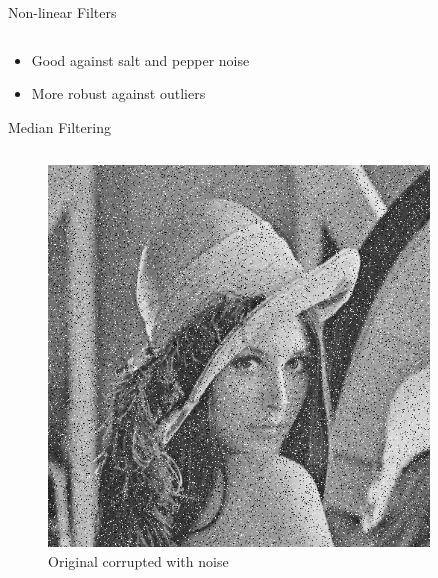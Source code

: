 \begin{frame}[t]{Non-linear Filters}
\begin{columns}[T, onlytextwidth]
\begin{column}{0.5\textwidth}
        \end{column}
    \end{columns}
    \vspace{-4.5\bigskipamount}
    {}
    \begin{itemize}
        \item Good against salt and pepper noise
        \item More robust against outliers
    \end{itemize}
\end{frame}

\begin{frame}[c]{Median Filtering}
    \begin{columns}[c,onlytextwidth]
        \begin{column}{0.45\textwidth}\centering
            \begin{figure}[]
                \centering
                \includegraphics[width=0.9\textwidth]{img/lena_sp}
                \caption{Original corrupted with noise}%
                \label{fig:name}
            \end{figure}

\end{column}
\end{columns}
\end{frame}
